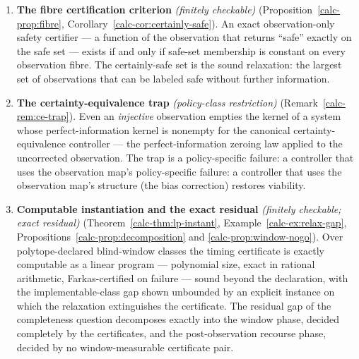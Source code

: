 \documentclass[10pt,twocolumn]{article}
\theoremstyle{definition}
\begin{document}
\begin{enumerate}
  full information. The mechanism is admissibility --- the common-action
  obstruction of Theorem~\ref{calc-thm:common-action} at minimal size --- and Example~\ref{calc-ex:hidden-mode} gives the hidden-mode instance.
\item
  \textbf{The fibre certification criterion} \emph{(finitely checkable)} (Proposition~\ref{calc-prop:fibre}, Corollary~\ref{calc-cor:certainly-safe}).
  An exact observation-only safety certifier --- a function of the
  observation that returns ``safe'' exactly on the safe set --- exists
  if and only if safe-set membership is constant on every observation
  fibre. The certainly-safe set is the sound relaxation: the largest set
  of observations that can be labeled safe without further information.
\item
  \textbf{The certainty-equivalence trap} \emph{(policy-class restriction)} (Remark~\ref{calc-rem:ce-trap}). Even an
  \emph{injective} observation empties the kernel of a system whose
  perfect-information kernel is nonempty for the canonical
  certainty-equivalence controller --- the perfect-information zeroing
  law applied to the uncorrected observation. The trap is a
  policy-specific failure: a controller that uses the observation map's
policy-specific failure: a controller that uses the observation map's
structure (the bias correction) restores viability.
\item
  \textbf{Computable instantiation and the exact residual} \emph{(finitely checkable;
  exact residual)} (Theorem~\ref{calc-thm:lp-instant}, Example~\ref{calc-ex:relax-gap},
  Propositions~\ref{calc-prop:decomposition} and \ref{calc-prop:window-nogo}). Over
  polytope-declared blind-window classes the timing certificate is exactly
  computable as a linear program --- polynomial size, exact in rational
  arithmetic, Farkas-certified on failure --- sound beyond the declaration,
  with the implementable-class gap shown unbounded by an explicit instance on
  which the relaxation extinguishes the certificate. The residual gap of the
  completeness question decomposes exactly into the window phase, decided
  completely by the certificates, and the post-observation recourse phase,
  decided by no window-measurable certificate pair.
\end{enumerate}
\end{document}

